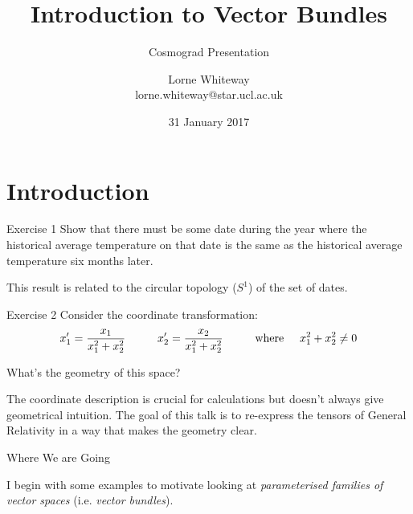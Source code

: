 \documentclass{beamer}
\title[Vector Bundles] %
{Introduction to Vector Bundles}
\subtitle{Cosmograd Presentation}
\author{Lorne Whiteway \\ lorne.whiteway@star.ucl.ac.uk}
\date{31 January 2017}
\begin{document}

\begin{frame}
  \titlepage
\end{frame}

\section{Introduction}

\begin{frame}{Exercise 1}
Show that there must be some date during the year where the historical average temperature on that date is the same as the historical average temperature six months later.

This result is related to the circular topology ($S^1$) of the set of dates.
\end{frame}

\begin{frame}{Exercise 2}
Consider the coordinate transformation:
\begin{equation*}
x'_1 = \frac{x_1}{x_1^2 + x_2^2} \hspace{1cm} x'_2 = \frac{x_2}{x_1^2 + x_2^2} \hspace{1cm} \text{where} \hspace{0.5cm} x_1^2 + x_2^2 \neq 0
\end{equation*}

What's the geometry of this space?

The coordinate description is crucial for calculations but doesn't always give geometrical intuition. The goal of this talk is to re-express the tensors of General Relativity in a way that makes the geometry clear.

\end{frame}

\begin{frame}{Where We are Going}

I begin with some examples to motivate looking at \textit{parameterised families of vector spaces} (i.e. \textit{vector bundles}).

\end{frame}
\end{document}

